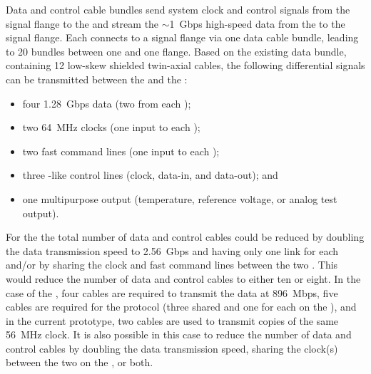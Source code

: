 Data and control cable bundles send system clock and control signals 
from the signal flange to the  and stream the $\sim$\SI{1}{Gbps} 
high-speed data from the  to the signal flange. Each 
 connects to a signal flange via one data cable bundle, 
leading to \num{20} bundles between one  and one flange. 
Based on the existing  data bundle, containing \num{12} 
low-skew shielded twin-axial cables, the following differential signals
can be transmitted between the  and the :
\begin{itemize}
\item four \SI{1.28}{Gbps} data (two from each );
\item two \SI{64}{MHz} clocks (one input to each );
\item two fast command lines (one input to each );
\item three -like control lines (clock, data-in, and data-out); and
\item one multipurpose  output (temperature, 
reference voltage, or analog test output).
\end{itemize}
For the   the total number of data and control cables could be 
reduced by doubling the data transmission speed to \SI{2.56}{Gbps}
and having only one link for each  and/or by
sharing the clock and fast command lines between the two 
 . This would reduce the number
of data and control cables to either ten or eight. In the
case of the , four cables are required to transmit
the data at \SI{896}{Mbps}, five cables are required for the
 protocol (three shared and one for each 
on the ), and in the current  prototype, 
two cables are used to transmit copies of the same \SI{56}{MHz}
clock. It is also possible in this case to reduce the 
number of data and control cables by %
doubling the data transmission 
speed, %
sharing the clock(s) between the two  
on the , or %
both.

